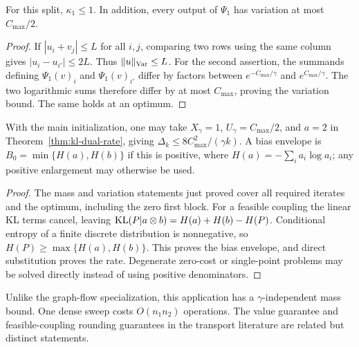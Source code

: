 \begin{proposition}\label{app-prop:kappa-ot}
For this split, $\kappa_1\leq1$. In addition, every output of $\Psi_1$ has variation at most $C_{\max}/2$.
\end{proposition}
\begin{proof}
If $|u_i+v_j|\leq L$ for all $i,j$, comparing two rows using the same column gives $|u_i-u_{i'}|\leq2L$. Thus $\|u\|_{\rm Var}\leq L$. For the second assertion, the summands defining $\Psi_1(v)_i$ and $\Psi_1(v)_{i'}$ differ by factors between $e^{-C_{\max}/\gamma}$ and $e^{C_{\max}/\gamma}$. The two logarithmic sums therefore differ by at most $C_{\max}$, proving the variation bound. The same holds at an optimum.
\end{proof}

\begin{corollary}\label{app-cor:ot-xgamma-ugamma}
With the main initialization, one may take $X_\gamma=1$, $U_\gamma=C_{\max}/2$, and $a=2$ in Theorem~\ref{thm:kl-dual-rate}, giving $\Delta_k\leq8C_{\max}^2/(\gamma k)$. A bias envelope is $B_0=\min\{H(a),H(b)\}$ if this is positive, where $H(a)=-\sum_i a_i\log a_i$; any positive enlargement may otherwise be used.
\end{corollary}
\begin{proof}
The mass and variation statements just proved cover all required iterates and the optimum, including the zero first block. For a feasible coupling the linear KL terms cancel, leaving $\mathrm{KL}(P|a\otimes b)=H(a)+H(b)-H(P)$. Conditional entropy of a finite discrete distribution is nonnegative, so $H(P)\geq\max\{H(a),H(b)\}$. This proves the bias envelope, and direct substitution proves the rate. Degenerate zero-cost or single-point problems may be solved directly instead of using positive denominators.
\end{proof}
Unlike the graph-flow specialization, this application has a $\gamma$-independent mass bound. One dense sweep costs $O(n_1n_2)$ operations. The value guarantee and feasible-coupling rounding guarantees in the transport literature are related but distinct statements.
